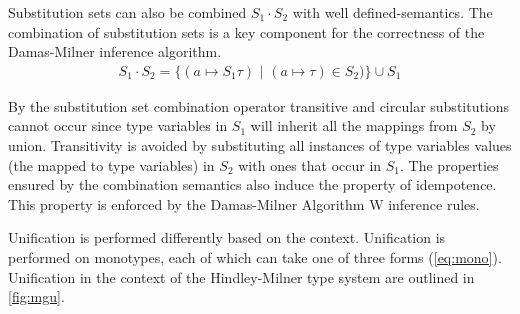 Substitution sets can also be combined $S_1 \cdot S_2$ with well defined-semantics.
The combination of substitution sets is a key component for the correctness of the Damas-Milner inference algorithm.
\begin{align}
    S_1 \cdot S_2 = \{ (a \mapsto S_1\tau) \,\,|\,\, (a \mapsto \tau) \in S_2) \} \cup S_1
    \label{eq:combination}
\end{align}
\begin{remark}
By the substitution set combination operator transitive and circular substitutions cannot occur since type variables in $S_1$ will inherit all the mappings from $S_2$ by union.
Transitivity is avoided by substituting all instances of type variables values (the mapped to type variables) in $S_2$ with ones that occur in $S_1$.
The properties ensured by the combination semantics also induce the property of idempotence.
This property is enforced by the Damas-Milner Algorithm W inference rules.
\end{remark}
Unification is performed differently based on the context.
Unification is performed on monotypes, each of which can take one of three forms (\autoref{eq:mono}).
Unification in the context of the Hindley-Milner type system are outlined in \autoref{fig:mgu}.
